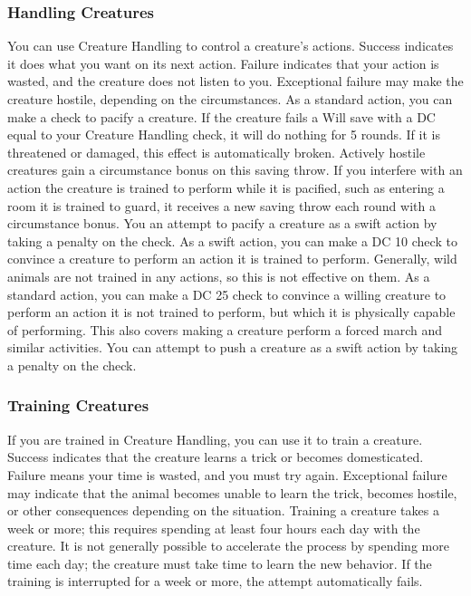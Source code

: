 \subsubsection{Handling Creatures}
You can use Creature Handling to control a creature's actions. Success indicates it does what you want on its next action. Failure indicates that your action is wasted, and the creature does not listen to you. Exceptional failure may make the creature hostile, depending on the circumstances.
 As a standard action, you can make a check to pacify a creature. If the creature fails a Will save with a DC equal to your Creature Handling check, it will do nothing for 5 rounds. If it is threatened or damaged, this effect is automatically broken. Actively hostile creatures gain a  circumstance bonus on this saving throw. If you interfere with an action the creature is trained to perform while it is pacified, such as entering a room it is trained to guard, it receives a new saving throw each round with a  circumstance bonus. You an attempt to pacify a creature as a swift action by taking a  penalty on the check.
 As a swift action, you can make a DC 10 check to convince a creature to perform an action it is trained to perform. Generally, wild animals are not trained in any actions, so this is not effective on them.
 As a standard action, you can make a DC 25 check to convince a willing creature to perform an action it is not trained to perform, but which it is physically capable of performing. This also covers making a creature perform a forced march and similar activities. You can attempt to push a creature as a swift action by taking a  penalty on the check.

\subsubsection{Training Creatures}
If you are trained in Creature Handling, you can use it to train a creature. Success indicates that the creature learns a trick or becomes domesticated. Failure means your time is wasted, and you must try again. Exceptional failure may indicate that the animal becomes unable to learn the trick, becomes hostile, or other consequences depending on the situation. Training a creature takes a week or more; this requires spending at least four hours each day with the creature. It is not generally possible to accelerate the process by spending more time each day; the creature must take time to learn the new behavior. If the training is interrupted for a week or more, the attempt automatically fails.


